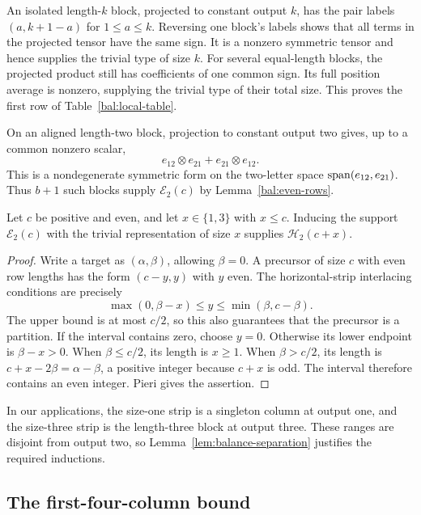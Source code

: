 An isolated length-$k$ block, projected to constant output $k$,
has the pair labels $(a,k+1-a)$ for $1\le a\le k$.  Reversing
one block's labels shows that all terms in the projected tensor
have the same sign.  It is a nonzero symmetric tensor and hence
supplies the trivial type of size $k$.  For several equal-length
blocks, the projected product still has coefficients of one
common sign.  Its full position average is nonzero, supplying
the trivial type of their total size.  This proves the first
row of Table~\ref{bal:local-table}.

On an aligned length-two block, projection to constant output two
gives, up to a common nonzero scalar,
\[
 e_{12}\otimes e_{21}+e_{21}\otimes e_{12}.
\]
This is a nondegenerate symmetric form on the two-letter space
$\operatorname{span}(e_{12},e_{21})$.  Thus $b+1$ such blocks supply
$\mathcal E_2(c)$ by Lemma~\ref{bal:even-rows}.

\begin{lemma}
\label{bal:odd-strip}
Let $c$ be positive and even, and let $x\in\{1,3\}$ with
$x\le c$.  Inducing the support $\mathcal E_2(c)$ with the
trivial representation of size $x$ supplies
$\mathcal H_2(c+x)$.
\end{lemma}

\begin{proof}
Write a target as $(\alpha,\beta)$, allowing $\beta=0$.
A precursor of size $c$ with even row lengths has the form
$(c-y,y)$ with $y$ even.  The horizontal-strip interlacing
conditions are precisely
\begin{equation}
 \max(0,\beta-x)\le y\le\min(\beta,c-\beta).
 \label{bal:parity-interval}
\end{equation}
The upper bound is at most $c/2$, so this also guarantees that
the precursor is a partition.  If the interval contains zero,
choose $y=0$.  Otherwise its lower endpoint is $\beta-x>0$.
When $\beta\le c/2$, its length is $x\ge1$.  When
$\beta>c/2$, its length is
$c+x-2\beta=\alpha-\beta$, a positive integer because
$c+x$ is odd.  The interval therefore contains an even integer.
Pieri gives the assertion.
\end{proof}

In our applications, the size-one strip is a singleton column
at output one, and the size-three strip is the length-three
block at output three.  These ranges are disjoint from output
two, so Lemma~\ref{lem:balance-separation} justifies the required
inductions.

\subsection{The first-four-column bound}

